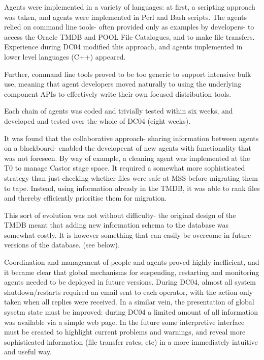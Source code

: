 \documentclass{cmspaper}
\begin{document}
Agents were implemented in a variety of languages: at first, a scripting approach was taken, and agents were implemented in Perl and Bash scripts. The agents relied on command line tools- often provided only as examples by developers- to access the Oracle TMDB and POOL File Catalogues, and to make file transfers. Experience during DC04 modified this approach, and agents implemented in lower level languages (C++) appeared. 

Further, command line tools proved to be too generic to support intensive bulk use, meaning that agent developers moved naturally to using the underlying component APIs to effectively write their own focused distribution tools.

Each chain of agents was coded and trivially tested within six weeks, and developed and tested over the whole of DC04 (eight weeks). 

It was found that the collaborative approach- sharing information between agents on a blackboard- enabled the developeent of new agents with functionality that was not foreseen. By way of example, a cleaning agent was implemented at the T0 to manage Castor stage space. It required a somewhat more sophisticated strategy than just checking whether files were safe at MSS before migrating them to tape. Instead, using information already in the TMDB, it was able to rank files and thereby efficiently prioritise them for migration.

This sort of evolution was not without difficulty- the original design of the TMDB meant that adding new information schema to the database was somewhat costly. It is however something that can easily be overcome in future versions of the database. (see below).

Coordination and management of people and agents proved highly inefficient, and it became clear that global mechanisms for suspending, restarting and monitoring agents needed to be deployed in future versions. During DC04, almost all system shutdown/restarts required an email sent to each operator, with the action only taken when all replies were received. In a similar vein, the presentation of global sysetm state must be improved: during DC04 a limited amount of all information was available via a simple web page. In the future some interpretive interface must be created to highlight current problems and warnings, and reveal more sophisticated information (file transfer rates, etc) in a more immediately intuitive and useful way.
\end{document}
